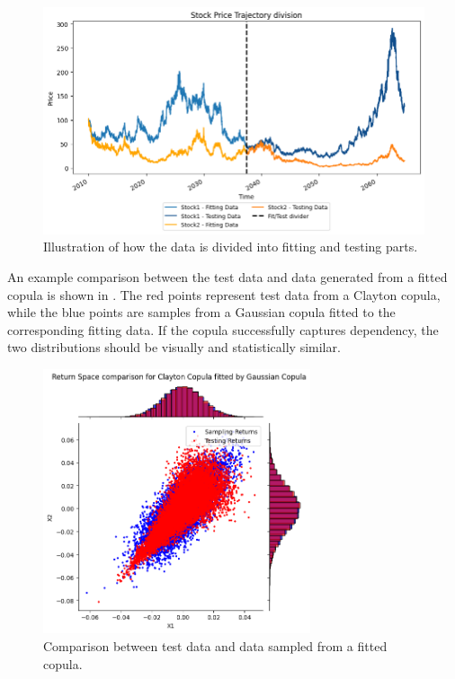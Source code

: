 \begin{figure}
\centering
\includegraphics[width=1\textwidth]{4Method/pictures/DataDivision.png}
\caption{Illustration of how the data is divided into fitting and testing parts.}
\label{fig:DataDivision}
\end{figure}

An example comparison between the test data and data generated from a fitted copula is shown in . The red points represent test data from a Clayton copula, while the blue points are samples from a Gaussian copula fitted to the corresponding fitting data. If the copula successfully captures dependency, the two distributions should be visually and statistically similar.

\begin{figure}
\centering
\includegraphics[width=0.7\textwidth]{4Method/pictures/TestSampleComparison.png}
\caption{Comparison between test data and data sampled from a fitted copula.}
\label{fig:TestSampleComparison}
\end{figure}


